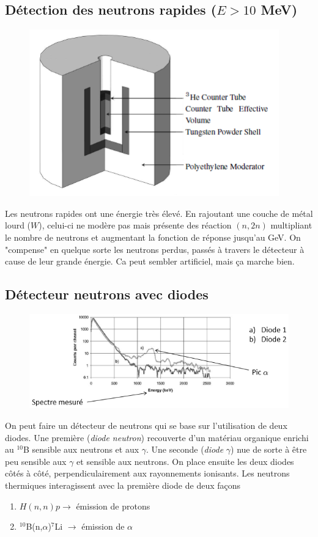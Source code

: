 \subsection{Détection des neutrons rapides ($E>10$ MeV)}
	\begin{figure}
	\vspace{-7mm}
	\includegraphics[scale=0.35]{ch11/image9}
	\end{figure}
Les neutrons rapides ont une énergie très élevé. En rajoutant une couche de métal lourd ($W$), 
celui-ci ne modère pas mais présente des réaction $(n,2n)$ multipliant le nombre de neutrons et
augmentant la fonction de réponse jusqu'au GeV. On "compense" en quelque sorte les neutrons perdus,
passés à travers le détecteur à cause de leur grande énergie. Ca peut sembler artificiel, mais ça
marche bien.

\subsection{Détecteur neutrons avec diodes}
	\begin{figure}
	\vspace{-5mm}
	\includegraphics[scale=0.55]{ch11/image10}
	\end{figure}
On peut faire un détecteur de neutrons qui se base sur l'utilisation de deux diodes. Une première
(\textit{diode neutron}) recouverte d'un matériau organique enrichi au $^{10}$B sensible aux 
neutrons et aux $\gamma$. Une seconde (\textit{diode} $\gamma$) nue de sorte à être peu sensible
aux $\gamma$ et sensible aux neutrons. On place ensuite les deux diodes côtés à côté, 
perpendiculairement aux rayonnements ionisants. Les neutrons thermiques interagissent avec la 
première diode de deux façons
\begin{enumerate}
\item $H(n,n)p \to $ émission de protons
\item $^{10}$B(n,$\alpha$)$^7$Li $\to$ émission de $\alpha$
\end{enumerate}\ 

